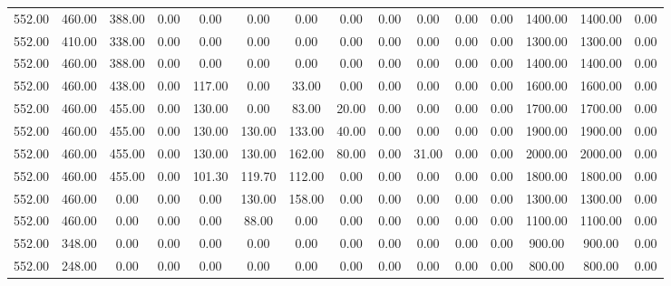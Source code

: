 \begin{table}[!ht]
{\begin{tabular}{ccccccccccccccc}
552.00 & 460.00 & 388.00 & 0.00 & 0.00 & 0.00 & 0.00 & 0.00 & 0.00 & 0.00 & 0.00 & 0.00 & 1400.00 & 1400.00 & 0.00 \\
552.00 & 410.00 & 338.00 & 0.00 & 0.00 & 0.00 & 0.00 & 0.00 & 0.00 & 0.00 & 0.00 & 0.00 & 1300.00 & 1300.00 & 0.00 \\
552.00 & 460.00 & 388.00 & 0.00 & 0.00 & 0.00 & 0.00 & 0.00 & 0.00 & 0.00 & 0.00 & 0.00 & 1400.00 & 1400.00 & 0.00 \\
552.00 & 460.00 & 438.00 & 0.00 & 117.00 & 0.00 & 33.00 & 0.00 & 0.00 & 0.00 & 0.00 & 0.00 & 1600.00 & 1600.00 & 0.00 \\
552.00 & 460.00 & 455.00 & 0.00 & 130.00 & 0.00 & 83.00 & 20.00 & 0.00 & 0.00 & 0.00 & 0.00 & 1700.00 & 1700.00 & 0.00 \\
552.00 & 460.00 & 455.00 & 0.00 & 130.00 & 130.00 & 133.00 & 40.00 & 0.00 & 0.00 & 0.00 & 0.00 & 1900.00 & 1900.00 & 0.00 \\
552.00 & 460.00 & 455.00 & 0.00 & 130.00 & 130.00 & 162.00 & 80.00 & 0.00 & 31.00 & 0.00 & 0.00 & 2000.00 & 2000.00 & 0.00 \\
552.00 & 460.00 & 455.00 & 0.00 & 101.30 & 119.70 & 112.00 & 0.00 & 0.00 & 0.00 & 0.00 & 0.00 & 1800.00 & 1800.00 & 0.00 \\
552.00 & 460.00 & 0.00 & 0.00 & 0.00 & 130.00 & 158.00 & 0.00 & 0.00 & 0.00 & 0.00 & 0.00 & 1300.00 & 1300.00 & 0.00 \\
552.00 & 460.00 & 0.00 & 0.00 & 0.00 & 88.00 & 0.00 & 0.00 & 0.00 & 0.00 & 0.00 & 0.00 & 1100.00 & 1100.00 & 0.00 \\
552.00 & 348.00 & 0.00 & 0.00 & 0.00 & 0.00 & 0.00 & 0.00 & 0.00 & 0.00 & 0.00 & 0.00 & 900.00 & 900.00 & 0.00 \\
552.00 & 248.00 & 0.00 & 0.00 & 0.00 & 0.00 & 0.00 & 0.00 & 0.00 & 0.00 & 0.00 & 0.00 & 800.00 & 800.00 & 0.00 \\
\bottomrule
\end{tabular}
}
\end{table}